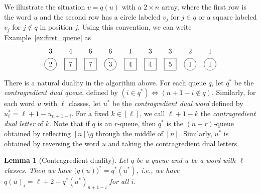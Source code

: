 \documentclass[reqno]{amsart}%
\newcommand{\0}{\phantom{c}}
\DeclareMathOperator{\inter}{int}
\newcommand{\defn}[1]{{\color{darkred}\emph{#1}}}
\theoremstyle{plain}
\newtheorem{lemma}[thm]{Lemma}
\theoremstyle{definition}
\numberwithin{equation}{section}
\begin{document}
We illustrate the situation $v = q(u)$ with a $2 \times n$ array, where the
first row is the word $u$ and the second row has a circle labeled $v_{j}$ for
$j \in q$ or a square labeled $v_{j}$ for $j \notin q$ in position $j$. Using
this convention, we can write Example~\ref{ex:first_queue} as
\[
\begin{tikzpicture}[baseline=10]
\def\ll{0.65}   %
\foreach \i in {5,9} { \node at (\i,\ll) {$1$}; }
\foreach \i in {8} { \node at (\i,\ll) {$2$}; }
\foreach \i in {1,6,7} { \node at (\i,\ll) {$3$}; }
\foreach \i in {2} { \node at (\i,\ll) {$4$}; }
\foreach \i in {3,4} { \node at (\i,\ll) {$6$}; }
\foreach \i in {1,4,8,9} { \draw (\i,0) circle (0.3); }
\foreach \i in {2,3,5,6,7} { \draw (\i-.3,0-.3) rectangle +(0.6,+0.6); }
\foreach \i in {8,9} { \node at (\i,0) {$1$}; }
\foreach \i in {1} { \node at (\i,0) {$2$}; }
\foreach \i in {4} { \node at (\i,0) {$3$}; }
\foreach \i in {5,6} { \node at (\i,0) {$4$}; }
\foreach \i in {7} { \node at (\i,0) {$5$}; }
\foreach \i in {2,3} { \node at (\i,0) {$7$}; }
\end{tikzpicture}
\]


\begin{comment}  %
Consider a pair $k, k+1 \pmod{n}$ of consecutive columns.
For $s > t$ the \defn{$s$-flow} from $k+1$ to $k$ is the number of $i$ such that $u_i=s$, and whose queueing interval $\inter[j,i]$ contains both $k$ and $k+1$.
Similarly, for $s < t$, the \defn{$s$-flow} from $k$ to $k+1$ is the number of $i$ such that $u_i = s$, and whose queueing interval $\inter[i,j]$ contains both $k$ and $k+1$.
\end{comment}


There is a natural duality in the algorithm above. For each queue $q$, let
$q^{*}$ be the {\color{darkred}\emph{contragredient dual queue}}, defined by
$\left(  i \in q^{*} \right)  \Longleftrightarrow\left(  n+1-i \notin q
\right)  $. Similarly, for each word $u$ with $\ell$ classes, let $u^{*}$ be
the {\color{darkred}\emph{contragredient dual word}} defined by $u^{*}_{i} =
\ell+ 1 - u_{n+1-i}$. For a fixed $k \in\left[  \ell\right]  $, we call $\ell+
1 - k$ the {\color{darkred}\emph{contragredient dual letter}} of $k$. Note
that if $q$ is an $r$-queue, then $q^{*}$ is the $(n-r)$-queue obtained by
reflecting $[n] \setminus q$ through the middle of $[n]$. Similarly, $u^{*}$
is obtained by reversing the word $u$ and taking the contragredient dual letters.

\begin{lemma}
[Contragredient duality]\label{le:dual} Let $q$ be a queue and $u$ be a word
with $\ell$ classes. Then we have $\bigl(q(u) \bigr)^{*} = q^{*}(u^{*})$,
\textit{i.e.}, we have $q(u)_{i} = \ell+ 2 - q^{*}(u^{*})_{n+1-i}$ for all $i$.
\end{lemma}
\end{document}
